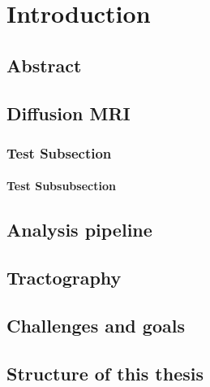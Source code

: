 \chapter{Introduction}

\section*{Abstract}
\lipsum[2-2]



\section{Diffusion MRI}
\lipsum[2-5]

\subsection{Test Subsection}
\subsubsection{Test Subsubsection}

\section{Analysis pipeline}
\lipsum[2-5]

\section{Tractography}
\lipsum[2-5]

\section{Challenges and goals}
\lipsum[2-5]

\section{Structure of this thesis}
\lipsum[2-5]